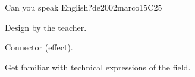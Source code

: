 \begin{syllabus}
\begin{unit}{Can you speak English?}{}{de2002marco}{15}{C25}
   \begin{topics}
      \item Design by the teacher.
      \item Connector (effect).
   \end{topics}

   \begin{learningoutcomes}
      \item Get familiar with technical expressions of the field.
   \end{learningoutcomes}
\end{unit}

\begin{coursebibliography}
\end{coursebibliography}

\end{syllabus}
%

